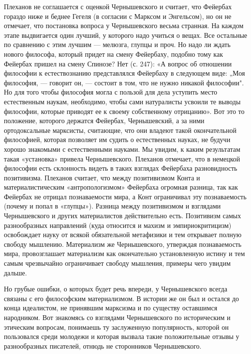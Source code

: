 Плеханов  не  соглашается  с  оценкой  Чернышевского  и  считает,  что
Фейербах  гораздо  ниже  и  беднее  Гегеля (в  согласии  с  Марксом  и
Энгельсом), но он не отмечает,  что постановка вопроса у Чернышевского
весьма странная. На  каждом этапе выдвигается один  лучший, у которого
надо учиться  о вещах. Все  остальные по  сравнению с этим  лучшим ---
мелюзга,  глупцы и  проч. Но  надо ли  ждать нового  философа, который
придет  на  смену  Фейербаху,  подобно тому  как  Фейербах  пришел  на
смену  Спинозе?  Нет  (с.  247):  «А  вопрос  об  отношении  философии
к  естествознанию  представлялся  Фейербаху  в  следующем  виде:  „Моя
философия, ---  говорит он, ---  состоит в  том, что не  нужно никакой
философии".  Но для  того чтобы  философия  могла с  пользой для  дела
уступить место естественным наукам, необходимо, чтобы сами натуралисты
усвоили те выводы философии, которые приводят ее к своему собственному
отрицанию».  Вот   это  то  положение,  которого   держатся  Фейербах,
Чернышевский, а  за ними ортодоксальные марксисты,  считающие, что они
владеют такой окончательной философией,  которая позволяет им судить о
естественных  науках,  не  будучи  хорошо  знакомыми  с  естественными
науками.  Мы увидим,  к  каким результатам  такая «установка»  привела
Чернышевского.  Плеханов  отмечает,  что  в  немецкой  философии  есть
склонность   видеть   в   таких   взглядах   Фейербаха   разновидность
позитивизма.  Плеханов   считает,  что  между  позитивизмом   Конта  и
материалистическим «антропологизмом»  Фейербаха огромная  разница, так
как Фейербах  не отрицал  познаваемости мира,  а Конт  ограничивал эту
познаваемость (почему и попал  в «глупцы»). Разница между позитивизмом
и  взглядами   Чернышевского  и  других   материалистов  действительно
есть.  Позитивизм самых  разнообразных направлений  (куда относится  и
махизм и  эмпириокритицизм) освобождает  науку от  всякой обязательной
метафизики  и тем  открывает полную  свободу мышлению.  Материализм же
Чернышевского, утверждая познаваемость мира, провозглашает материализм
как  окончательно   установленную  истину  и  тем   самым  чрезвычайно
ограничивает свободу мышления, примеры чего увидим дальше.

Но грубые ошибки, о которых будет речь впереди, у Чернышевского всегда
связаны с его философским материализмом. В истории же он был и остался
до конца идеалистом,  не принявшим марксизма и  по существу оставшимся
народником. Вот знакомясь со взглядами Чернышевского по историческим и
этическим вопросам, понимаешь ту  заслуженную популярность, которой он
пользовался  среди  молодежи  и которая  вызвала  такие  положительные
отзывы у разнообразных писателей, отнюдь не сторонников Чернышевского.

